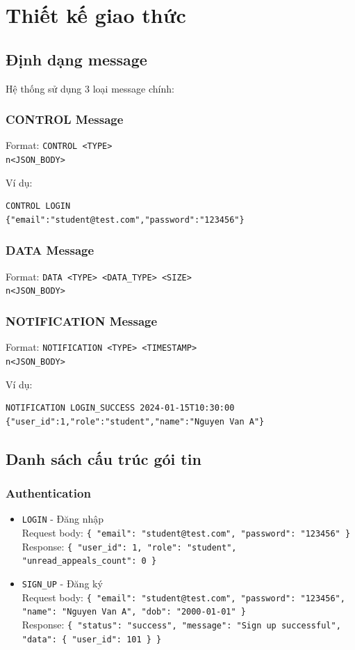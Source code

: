 \documentclass[12pt,a4paper]{report}
\newcommand{\json}[1]{\texttt{\allowbreak#1\allowbreak}}
\begin{document}
\section{Thiết kế giao thức}

\subsection{Định dạng message}

Hệ thống sử dụng 3 loại message chính:

\subsubsection{CONTROL Message}
Format: \texttt{CONTROL <TYPE>\\n<JSON\_BODY>}

Ví dụ:
\begin{lstlisting}
CONTROL LOGIN
{"email":"student@test.com","password":"123456"}
\end{lstlisting}

\subsubsection{DATA Message}
Format: \texttt{DATA <TYPE> <DATA\_TYPE> <SIZE>\\n<JSON\_BODY>}

\subsubsection{NOTIFICATION Message}
Format: \texttt{NOTIFICATION <TYPE> <TIMESTAMP>\\n<JSON\_BODY>}

Ví dụ:
\begin{lstlisting}
NOTIFICATION LOGIN_SUCCESS 2024-01-15T10:30:00
{"user_id":1,"role":"student","name":"Nguyen Van A"}
\end{lstlisting}

\subsection{Danh sách cấu trúc gói tin}

\sloppy
\subsubsection{Authentication}
\begin{itemize}
    \item \texttt{LOGIN} - Đăng nhập \\
    Request body: \json{\{ "email": "student@test.com", "password": "123456" \}} \\
    Response: \json{\{ "user\_id": 1, "role": "student", "unread\_appeals\_count": 0 \}}
    \item \texttt{SIGN\_UP} - Đăng ký \\
    Request body: \json{\{ "email": "student@test.com", "password": "123456", "name": "Nguyen Van A", "dob": "2000-01-01" \}} \\
    Response: \json{\{ "status": "success", "message": "Sign up successful", "data": \{ "user\_id": 101 \} \}}
\end{itemize}
\end{document}
